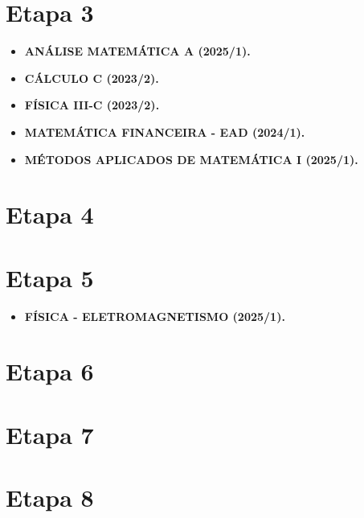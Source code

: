 \documentclass[12pt]{article}
\begin{document}
\section{Etapa 3}

\begin{itemize}
    \item \textbf{ANÁLISE MATEMÁTICA A (2025/1).}
    \item \textbf{CÁLCULO C (2023/2).}
    \item \textbf{FÍSICA III-C (2023/2).}
    \item \textbf{MATEMÁTICA FINANCEIRA - EAD (2024/1).}
    \item \textbf{MÉTODOS APLICADOS DE MATEMÁTICA I (2025/1).}
\end{itemize}

\section{Etapa 4}
\section{Etapa 5}

\begin{itemize}
    \item \textbf{FÍSICA - ELETROMAGNETISMO (2025/1).}
\end{itemize}

\section{Etapa 6}
\section{Etapa 7}
\section{Etapa 8}
\end{document}
